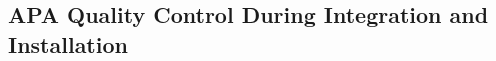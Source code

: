 \begin{comment}
\begin{dunefigure}[Underground handling of the APAs]{fig:handling}{(Top row) Handling of an \dword{apa} in the underground storage area where the \dword{apa}s are extracted from the crates, inspected, and readied for installation in the cryostat. (Bottom row) A pair of \dword{apa}s is brought into the space just outside the \dword{tco} to be linked and cabled, then connected to the \dword{dss} and moved into its final position inside the cryostat.}
\setlength{\fboxsep}{0pt}
\setlength{\fboxrule}{0.5pt}
\centering
\fbox{\texttt{[image: sp-apa-install-1.png]}} 
\fbox{\texttt{[image: sp-apa-install-2.png]}} 
\fbox{\texttt{[image: sp-apa-install-3.png]}} 
\\ \vspace*{1.5mm}
\hspace*{-.25mm}
\fbox{\texttt{[image: sp-apa-install-4.png]}}
\hspace*{1.mm}
\fbox{\texttt{[image: sp-apa-install-5.png]}}
\end{dunefigure}
\end{comment}

\subsection{APA Quality Control During Integration and Installation} %
\label{sec:fdsp-apa-transport-qc}


